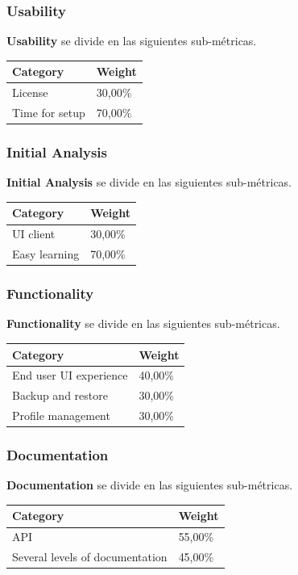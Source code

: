 \documentclass[xcolor=dvipsnames]{beamer}
\begin{document}
\begin{frame}[allowframebreaks]
\frametitle{Usability}

\par \textbf{Usability} se divide en las siguientes sub-m\'etricas.

\begin{tabular}{|l|l|}
    \hline {\bf Category} & {\bf Weight}\\
    \hline License	 & 30,00\%\\
    \hline Time for setup & 70,00\%\\
    \hline
\end{tabular}

\end{frame}

\begin{frame}[allowframebreaks]
\frametitle{Initial Analysis}

\par \textbf{Initial Analysis} se divide en las siguientes sub-m\'etricas.

\begin{tabular}{|l|l|}
    \hline {\bf Category} & {\bf Weight}\\
    \hline UI client	 & 30,00\%\\
    \hline Easy learning & 70,00\%\\
    \hline
\end{tabular}

\end{frame}

\begin{frame}[allowframebreaks]
\frametitle{Functionality}

\par \textbf{Functionality} se divide en las siguientes sub-m\'etricas.

\begin{tabular}{|l|l|}
    \hline {\bf Category} & {\bf Weight}\\
    \hline End user UI experience & 40,00\%\\
    \hline Backup and restore & 30,00\%\\
    \hline Profile management & 30,00\%\\
    \hline
\end{tabular}

\end{frame}

\begin{frame}[allowframebreaks]
\frametitle{Documentation}

\par \textbf{Documentation} se divide en las siguientes sub-m\'etricas.

\begin{tabular}{|l|l|}
    \hline {\bf Category} & {\bf Weight}\\
    \hline API	 & 55,00\%\\
    \hline Several levels of documentation & 45,00\%\\
    \hline
\end{tabular}

\end{frame}
\end{document}

